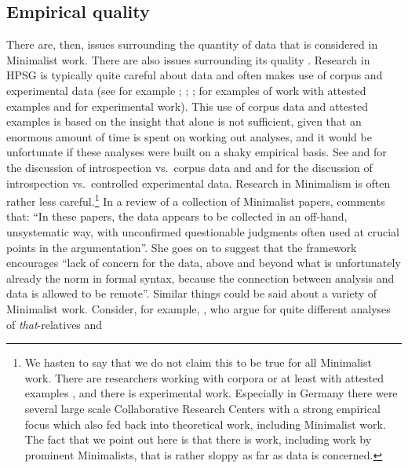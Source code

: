 \documentclass[output=paper
                ,modfonts
                ,nonflat
	        ,collection
	        ,collectionchapter
	        ,collectiontoclongg
 	        ,biblatex
                ,babelshorthands
                ,newtxmath
                ,draftmode
                ,colorlinks, citecolor=brown
]{./langsci/langscibook}
\begin{document}
\subsection{Empirical quality}
\label{sec-empirical-quality}

There are, then, issues surrounding the quantity of data that is considered in Minimalist work. There are
also issues surrounding its quality \citep{Schuetze2016a}. Research in HPSG is typically quite careful about data and often
makes use of corpus and experimental data (see for example
\citealt*{AA2017a-u,Mueller99a,Mueller2002b,BC2010a,MBC2012a,Chaves2013a-u,Miller2013a}; \citealt[Chapter~7]{VanEynde2015a-u};
\citealt{ACS2016a-u}; \citealt{SAHM2019a-u}
for examples of work with attested examples and for experimental work).
This use of corpus data and attested examples is based on the insight that  alone is not sufficient, given that an
enormous amount of time is spent on working out analyses, and it would be unfortunate if these analyses
were built on a shaky empirical basis. See  and  for the
discussion of introspection vs.\ corpus data and  and  for the discussion of introspection
vs.\ controlled experimental data.
Research in Minimalism is often rather less
careful.\footnote{
 We hasten to say that we do not claim this to be true for all Minimalist work. There are
 researchers working with corpora or at least with attested examples \citep{Wurmbrand2003a}, and
 there is experimental work. Especially in Germany there were several large scale Collaborative
 Research Centers with a strong empirical focus which also fed back into theoretical work, including
 Minimalist work. The fact that we point out here is that there is work, including work
 by prominent Minimalists, that is rather sloppy as far as data is concerned.%
} In a review of a collection of Minimalist papers, \citet[]{Bender2002b-u} comments that: ``In
these papers, the data appears to be collected in an off-hand, unsystematic way, with unconfirmed
questionable judgments often used at crucial points in the argumentation''. She goes on to suggest
that the framework encourages ``lack of concern for the data, above and beyond what is unfortunately
already the norm in formal syntax, because the connection between analysis and data is allowed to be
remote''. Similar things could be said about a variety of Minimalist work. Consider, for example,
\citet{AounLi.2003}, who argue for quite different analyses of \emph{that}-relatives and
\end{document}
